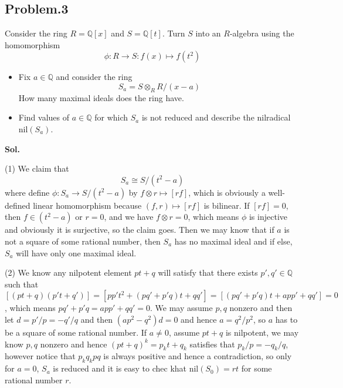 \documentclass[lang=en,11pt,a4paper,citestyle =authoryear]{elegantpaper}
\begin{document}
\subsection*{Problem.3} 
Consider the ring $R = \mathbb{Q}[x]$ and $S = \mathbb{Q}[t]$. Turn $S$ into an $R$-algebra using the homomorphism
\[\phi:R\to S:f(x) \mapsto f(t^2)\]
\begin{itemize}
\item Fix $a\in\mathbb{Q}$ and consider the ring
    \[S_a = S \otimes_R R/(x-a)\]
    How many maximal ideals does the ring have.
\item Find values of $a\in\mathbb{Q}$ for which $S_a$ is not reduced and describe the nilradical $\text{nil}(S_a)$.
\end{itemize}
\vspace{0.5em}
\textbf{Sol.} \par
    (1) We claim that
    \[S_a \cong S/(t^2-a)\]
    where define $\phi:S_a \to S/(t^2 - a)$ by $f\otimes r \mapsto [rf]$, which is obviously a well-defined linear homomorphism because $(f,r) \mapsto [rf]$ is bilinear. If $[rf] = 0$, then $ f\in (t^2 - a)$ or $r=0$, and we have $f\otimes r = 0$, which means $\phi$ is injective and obviously it is surjective, so the claim goes. Then we may know that if $a$ is not a square of some rational number, then $S_a$ has no maximal ideal and if else, $S_a$ will have only one maximal ideal.\par
    (2) We know any nilpotent element $pt+q$ will satisfy that there exists $p',q'\in\mathbb{Q}$ such that $[(pt+q)(p't+q')]= [pp' t^2 + (pq'+p'q)t + qq'] = [(pq'+p'q)t + app'+qq'] = 0$, which means $pq' + p'q = app'+qq' = 0$. We may assume $p,q$ nonzero and then let $d = p'/p = - q'/q$ and then $(ap^2 - q^2 )d = 0$ and hence $a = q^2/p^2$, so $a$ has to be a square of some rational number. If $a\neq 0$, assume $pt+q$ is nilpotent, we may know $p,q$ nonzero and hence $(pt+q)^k = p_kt + q_k$ satisfies that $p_k/p = - q_k/q$, however notice that $p_kq_k pq$ is always positive and hence a contradiction, so only for $a = 0$, $S_a$ is reduced and it is easy to chec khat $\text{nil}(S_0) = rt$ for some rational number $r$.
\vspace{0.5em}
\end{document}
